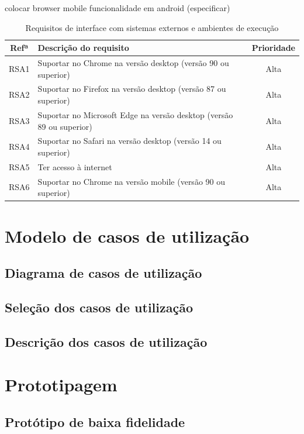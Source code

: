 \documentclass[11pt, twoside]{report}
\begin{document}
	colocar browser mobile
	funcionalidade em android (especificar)
	
	\begin{table}[H]
		\caption{Requisitos de interface com sistemas externos e ambientes de execução}	
		\begin{center}
		\begin{tabularx}{\textwidth}{|c|X|c|}
			\hline
			\textbf{Refª }	& \textbf{Descrição do requisito} & \textbf{Prioridade} \\
			\hline
			RSA1 & Suportar no Chrome na versão desktop (versão 90 ou superior) &Alta\\
			\hline
			RSA2 &Suportar no Firefox na versão desktop (versão 87 ou superior) &Alta\\
			\hline 
			RSA3 &Suportar no Microsoft Edge na versão desktop (versão 89 ou superior)&Alta\\
			\hline
			RSA4 &Suportar no Safari na versão desktop (versão 14 ou superior)&Alta\\
			\hline
			RSA5 &Ter acesso à internet&Alta\\
			\hline
			RSA6 &Suportar no Chrome na versão mobile (versão 90 ou superior)&Alta\\
			\hline
		\end{tabularx}
		\label{requisitosdesistemas}
	\end{center}
\end{table}
	
	\chapter{Modelo de casos de utilização}
	\section{Diagrama de casos de utilização}
	\section{Seleção dos casos de utilização}
	\section{Descrição dos casos de utilização}
	
	\chapter{Prototipagem}
	\section{Protótipo de baixa fidelidade}
\end{document}
